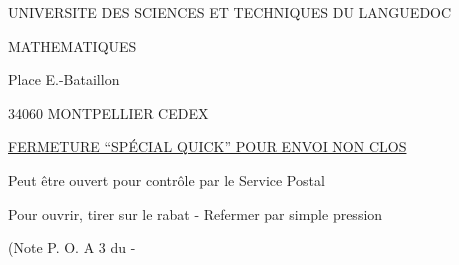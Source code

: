 UNIVERSITE DES SCIENCES ET TECHNIQUES
DU LANGUEDOC

MATHEMATIQUES

Place E.-Bataillon

34060 MONTPELLIER CEDEX


\uline{FERMETURE ``SPÉCIAL QUICK'' POUR ENVOI NON CLOS}

Peut être ouvert pour contrôle par le Service Postal

Pour ouvrir, tirer sur le rabat - Refermer par simple pression

(Note P. O. A 3 du  -  
